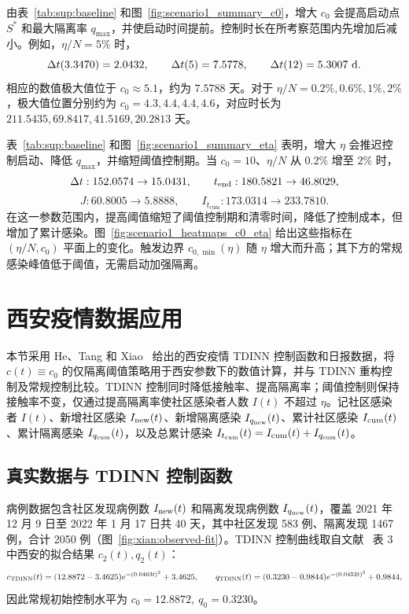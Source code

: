 \documentclass[lang=cn,a4paper,newtx]{elegantpaper}
\numberwithin{equation}{section}
\theoremstyle{plain}
\newcommand{\Itcum}{I_{t_{\mathrm{cum}}}}
\begin{document}
由表~\ref*{tab:sup:baseline} 和图~\ref{fig:scenario1_summary_c0}，增大 $c_0$ 会提高启动点 $S^*$ 和最大隔离率 $q_{\max}$，并使启动时间提前。控制时长在所考察范围内先增加后减小。例如，$\eta/N=5\%$ 时，
\[
\Delta t(3.3470)=2.0432,\qquad
\Delta t(5)=7.5778,\qquad
\Delta t(12)=5.3007\ {\rm d}.
\]
相应的数值极大值位于 $c_0\approx5.1$，约为 $7.5788$ 天。对于 $\eta/N=0.2\%,0.6\%,1\%,2\%$，极大值位置分别约为 $c_0=4.3,4.4,4.4,4.6$，对应时长为 $211.5435,69.8417,41.5169,20.2813$ 天。

表~\ref*{tab:sup:baseline} 和图~\ref{fig:scenario1_summary_eta} 表明，增大 $\eta$ 会推迟控制启动、降低 $q_{\max}$，并缩短阈值控制期。当 $c_0=10$、$\eta/N$ 从 $0.2\%$ 增至 $2\%$ 时，
\[
\Delta t:152.0574\to15.0431,\qquad
t_{\rm end}:180.5821\to46.8029,
\]
\[
J:60.8005\to5.8888,\qquad
\Itcum:173.0314\to233.7810.
\]
在这一参数范围内，提高阈值缩短了阈值控制期和清零时间，降低了控制成本，但增加了累计感染。图~\ref{fig:scenario1_heatmaps_c0_eta} 给出这些指标在 $(\eta/N,c_0)$ 平面上的变化。触发边界 $c_{0,\min}(\eta)$ 随 $\eta$ 增大而升高；其下方的常规感染峰值低于阈值，无需启动加强隔离。


\FloatBarrier

\section{西安疫情数据应用}
\label{sec:xian}

本节采用 He、Tang 和 Xiao~\cite{He2023TDINN} 给出的西安疫情 TDINN 控制函数和日报数据，将 $c(t)\equiv c_0$ 的仅隔离阈值策略用于西安参数下的数值计算，并与 TDINN 重构控制及常规控制比较。TDINN 控制同时降低接触率、提高隔离率；阈值控制则保持接触率不变，仅通过提高隔离率使社区感染者人数 $I(t)$ 不超过 $\eta$。记社区感染者 $I(t)$、新增社区感染 $I_{\rm new}(t)$、新增隔离感染 $I_{q_{\rm new}}(t)$、累计社区感染 $I_{\rm cum}(t)$、累计隔离感染 $I_{q_{\rm cum}}(t)$，以及总累计感染 $\Itcum(t)=I_{\rm cum}(t)+I_{q_{\rm cum}}(t)$。

\subsection{真实数据与 TDINN 控制函数}
病例数据包含社区发现病例数 $I_{\rm new}(t)$ 和隔离发现病例数 $I_{q_{\rm new}}(t)$，覆盖 2021 年 12 月 9 日至 2022 年 1 月 17 日共 40 天，其中社区发现 583 例、隔离发现 1467 例，合计 2050 例（图~\ref{fig:xian:observed-fit}）。TDINN 控制曲线取自文献~\cite{He2023TDINN} 表 3 中西安的拟合结果 $c_2(t),q_2(t)$：
\begin{equation}
c_{\rm TDINN}(t)=(12.8872-3.4625)e^{-(0.0463t)^2}+3.4625,\qquad
q_{\rm TDINN}(t)=(0.3230-0.9844)e^{-(0.0452t)^2}+0.9844,
\end{equation}
因此常规初始控制水平为 $c_0=12.8872,\ q_0=0.3230$。
\end{document}
